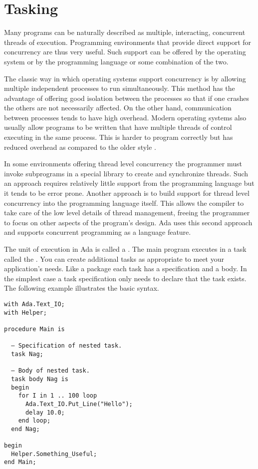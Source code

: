 \section{Tasking}

Many programs can be naturally described as multiple, interacting, concurrent threads of
execution. Programming environments that provide direct support for concurrency are thus very
useful. Such support can be offered by the operating system or by the programming language or
some combination of the two.

The classic way in which operating systems support concurrency is by allowing multiple
independent processes to run simultaneously. This method has the advantage of offering good
isolation between the processes so that if one crashes the others are not necessarily affected.
On the other hand, communication between processes tends to have high overhead. Modern operating
systems also usually allow programs to be written that have multiple threads of control
executing in the same process. This  is harder to program
correctly but has reduced overhead as compared to the older style .

In some environments offering thread level concurrency the programmer must invoke subprograms in
a special library to create and synchronize threads. Such an approach requires relatively little
support from the programming language but it tends to be error prone. Another approach is to
build support for thread level concurrency into the programming language itself. This allows the
compiler to take care of the low level details of thread management, freeing the programmer to
focus on other aspects of the program's design. Ada uses this second approach and supports
concurrent programming as a language feature.

The unit of execution in Ada is called a . The main program executes in a task
called the . You can create additional tasks as appropriate to meet
your application's needs. Like a package each task has a specification and a body. In the
simplest case a task specification only needs to declare that the task exists. The following
example illustrates the basic syntax.

\begin{lstlisting}
with Ada.Text_IO;
with Helper;

procedure Main is

  – Specification of nested task.
  task Nag;

  – Body of nested task.
  task body Nag is
  begin
    for I in 1 .. 100 loop
      Ada.Text_IO.Put_Line("Hello");
      delay 10.0;
    end loop;
  end Nag;

begin
  Helper.Something_Useful;
end Main;
\end{lstlisting}

